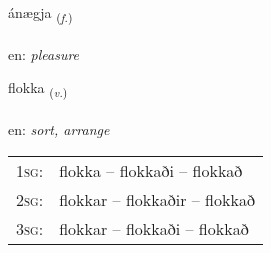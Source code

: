 \documentclass[frontgrid, backgrid]{flacards}\usepackage[]{graphicx}\usepackage[]{color}
\begin{document}
\renewcommand{\flhead}{\vskip5pt \fboxsep=0pt {\small\bfseries\footnotesize Nafnorð | Noun}}
\renewcommand{\fcfoot}{\vskip5pt \fboxsep=0pt \hspace{2pt}{\small\bfseries\footnotesize 2K}}

\renewcommand{\blhead}{\vskip5pt {\small\bfseries\footnotesize Nafnorð | Noun }}
\renewcommand{\bcfoot}{\vskip5pt \hspace{2pt}{\small\bfseries\footnotesize 2K}}


{ánægja \small{\textsubscript{(\textit{f.})}} \\[1ex] %
\textphonetic{[auːnaija]} \\
en: \emph{pleasure} \\  [2ex]
\renewcommand*{\arraystretch}{0.8}
}

\renewcommand{\flhead}{\vskip5pt \fboxsep=0pt {\small\bfseries\footnotesize Sagnorð | Verb}}
\renewcommand{\fcfoot}{\vskip5pt \fboxsep=0pt \hspace{2pt}{\small\bfseries\footnotesize 2K}}

\renewcommand{\blhead}{\vskip5pt {\small\bfseries\footnotesize Sagnorð | Verb }}
\renewcommand{\bcfoot}{\vskip5pt \hspace{2pt}{\small\bfseries\footnotesize 2K}}


{flokka \small{\textsubscript{(\textit{v.})}} \\[1ex] %
\textphonetic{[flɔhka]} \\
en: \emph{sort, arrange} \\  [2ex]
\renewcommand*{\arraystretch}{0.8}
\begin{tabular}{p{1cm}l}
\textsc{1sg}: & flokka -- flokkaði -- flokkað \\ 
\textsc{2sg}: & flokkar -- flokkaðir -- flokkað \\ 
\textsc{3sg}: & flokkar -- flokkaði -- flokkað \\ 
\end{tabular}
}
\end{document}
